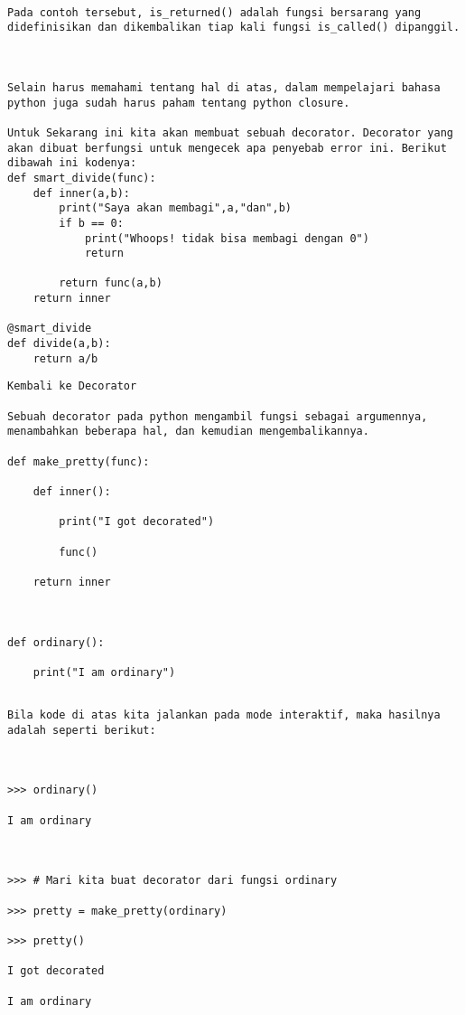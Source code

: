 \documentclass[12pt,a4paper]{article}
\begin{document}
\begin{verbatim}

Pada contoh tersebut, is_returned() adalah fungsi bersarang yang didefinisikan dan dikembalikan tiap kali fungsi is_called() dipanggil.



Selain harus memahami tentang hal di atas, dalam mempelajari bahasa python juga sudah harus paham tentang python closure.

Untuk Sekarang ini kita akan membuat sebuah decorator. Decorator yang akan dibuat berfungsi untuk mengecek apa penyebab error ini. Berikut dibawah ini kodenya:
def smart_divide(func):
    def inner(a,b):
        print("Saya akan membagi",a,"dan",b)
        if b == 0:
            print("Whoops! tidak bisa membagi dengan 0")
            return

        return func(a,b)
    return inner

@smart_divide
def divide(a,b):
    return a/b
\end{verbatim}

\begin{verbatim}
Kembali ke Decorator

Sebuah decorator pada python mengambil fungsi sebagai argumennya, menambahkan beberapa hal, dan kemudian mengembalikannya.

def make_pretty(func):

    def inner():

        print("I got decorated")

        func()

    return inner



def ordinary():

    print("I am ordinary")

\end{verbatim}









\begin{verbatim}

Bila kode di atas kita jalankan pada mode interaktif, maka hasilnya adalah seperti berikut:



>>> ordinary()

I am ordinary



>>> # Mari kita buat decorator dari fungsi ordinary

>>> pretty = make_pretty(ordinary)

>>> pretty()

I got decorated

I am ordinary



\end{verbatim}
\end{document}

